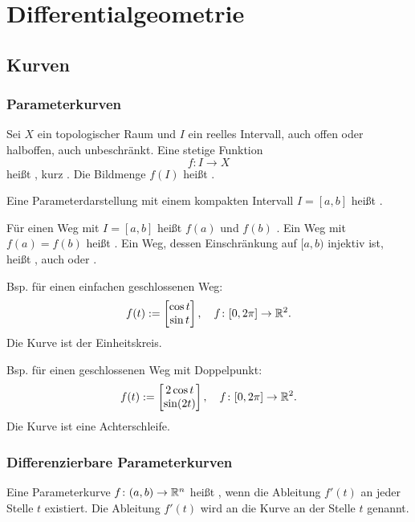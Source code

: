 
\chapter{Differentialgeometrie}
\section{Kurven}
\subsection{Parameterkurven}
\begin{Definition}
Sei $X$ ein topologischer Raum und
$I$ ein reelles Intervall, auch offen oder halboffen, auch unbeschränkt.
Eine stetige Funktion
\begin{equation}
f\colon I\to X
\end{equation}
heißt , kurz
. Die Bildmenge $f(I)$ heißt .
\end{Definition}

Eine Parameterdarstellung mit einem kompakten Intervall $I=[a,b]$
heißt .

Für einen Weg mit $I=[a,b]$ heißt $f(a)$ 
und $f(b)$ . Ein Weg mit $f(a)=f(b)$
heißt . Ein Weg, dessen Einschränkung auf $[a,b)$
injektiv ist, heißt , auch  oder
.

Bsp. für einen einfachen geschlossenen Weg:
\begin{equation}
f(t):=\begin{bmatrix}
\cos t\\
\sin t
\end{bmatrix},\quad
f\colon [0,2\pi]\to \mathbb R^2.
\end{equation}
Die Kurve ist der Einheitskreis.

Bsp. für einen geschlossenen Weg mit Doppelpunkt:
\begin{equation}
f(t):=\begin{bmatrix}
2\cos t\\
\sin(2t)
\end{bmatrix},\quad
f\colon [0,2\pi]\to \mathbb R^2.
\end{equation}
Die Kurve ist eine Achterschleife.

\subsection{Differenzierbare Parameterkurven}
\begin{Definition}
Eine Parameterkurve $f\colon (a,b)\to\mathbb R^n$ heißt
, wenn die Ableitung $f'(t)$ an jeder Stelle
$t$ existiert. Die Ableitung $f'(t)$ wird
 an die Kurve an der Stelle $t$ genannt.
\end{Definition}

